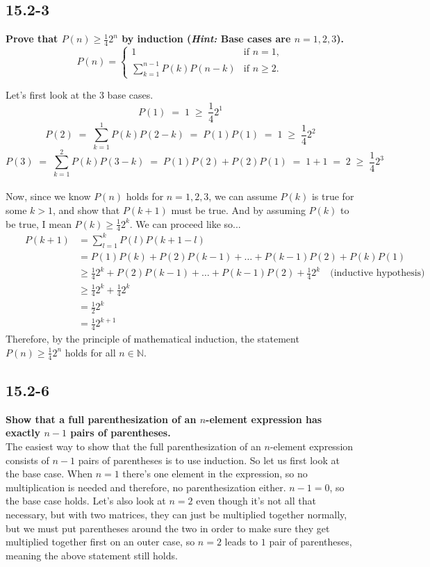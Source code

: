\documentclass[11pt]{article}
\begin{document}
 \subsection*{15.2-3}
 \textbf{Prove that $P(n) \geq \frac{1}{4}2^n$ by induction (\textit{Hint:} Base cases are 
 $n=1,2,3$).}
 \[
   P(n) = 
   \begin{cases}
     1 & \text{if } n = 1, \\
     \displaystyle\sum_{k=1}^{n-1} P(k)P(n-k) & \text{if } n \geq 2.
   \end{cases}
 \]

 Let's first look at the 3 base cases. 
$$P(1) \;=\; 1 \;\geq\; \frac{1}{4}2^1$$
$$P(2) \;=\; \displaystyle\sum_{k=1}^{1}P(k)P(2-k) \;=\; P(1)P(1) \;=\; 1 \;\geq\; 
\frac{1}{4}2^2$$
$$P(3) \;=\; \displaystyle\sum_{k=1}^{2}P(k)P(3-k) \;=\; P(1)P(2) + P(2)P(1) \;=\; 
1 + 1 \;=\; 2 \;\geq\; \frac{1}{4}2^3$$ \\

Now, since we know $P(n)$ holds for $n=1,2,3$, we can assume $P(k)$ is true for some $k > 1$, and 
show that $P(k+1)$ must be true.  And by assuming $P(k)$ to be true, I mean 
$P(k) \geq \frac{1}{4}2^k$.  We can proceed like so...
\begin{align*}
  && P(k+1) &= \displaystyle\sum_{l=1}^{k}P(l)P(k+1-l) && \\
  && &= P(1)P(k) + P(2)P(k-1) + \dots + P(k-1)P(2) + P(k)P(1) && \\
  && &\geq \frac{1}{4}2^k + P(2)P(k-1) + \dots + P(k-1)P(2) + \frac{1}{4}2^k \quad
  \text{(inductive hypothesis)} && \\
  && &\geq \frac{1}{4}2^k + \frac{1}{4}2^k && \\
  && &= \frac{1}{2}2^k && \\
  && &= \frac{1}{4}2^{k+1} &&
\end{align*}
Therefore, by the principle of mathematical induction, the statement $P(n) \geq \frac{1}{4}2^n$ 
holds for all $n \in \mathbb{N}$.
 \newpage

 \subsection*{15.2-6}
 \textbf{Show that a full parenthesization of an $n$-element expression has exactly $n-1$ pairs 
 of parentheses.} \\

 The easiest way to show that the full parenthesization of an $n$-element expression consists of 
 $n-1$ pairs of parentheses is to use induction.  So let us first look at the base case.  When 
 $n=1$ there's one element in the expression, so no multiplication is needed and therefore, no 
 parenthesization either. $n-1=0$, so the base case holds.  Let's also look at $n=2$ even though 
 it's not all that necessary, but with two matrices, they can just be multiplied together 
 normally, but we must put parentheses around the two in order to make sure they get multiplied 
 together first on an outer case, so $n=2$ leads to $1$ pair of parentheses, meaning the above 
 statement still holds. \\
\end{document}
